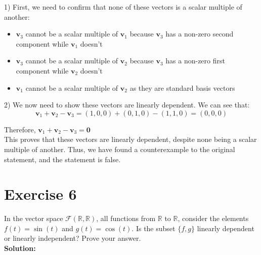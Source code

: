 \documentclass{article}
\begin{document}
1) First, we need to confirm that none of these vectors is a scalar multiple of another:
\begin{itemize}
   \item $\mathbf{v}_3$ cannot be a scalar multiple of $\mathbf{v}_1$ because $\mathbf{v}_3$ has a non-zero second component while $\mathbf{v}_1$ doesn't
   \item $\mathbf{v}_3$ cannot be a scalar multiple of $\mathbf{v}_2$ because $\mathbf{v}_3$ has a non-zero first component while $\mathbf{v}_2$ doesn't
   \item $\mathbf{v}_1$ cannot be a scalar multiple of $\mathbf{v}_2$ as they are standard basis vectors
\end{itemize}

2) We now need to show these vectors are linearly dependent.
We can see that:
\[
\mathbf{v}_1 + \mathbf{v}_2 - \mathbf{v}_3 = (1,0,0) + (0,1,0) - (1,1,0) = (0,0,0)
\]

Therefore, $\mathbf{v}_1 + \mathbf{v}_2 - \mathbf{v}_3 = \mathbf{0}$ \\

This proves that these vectors are linearly dependent, despite none being a scalar multiple of another. Thus, we have found a counterexample to the original statement, and the statement is false.

\newpage

\section*{Exercise 6}
In the vector space $\mathcal{F}(\mathbb{R},\mathbb{R})$, all functions from $\mathbb{R}$ to $\mathbb{R}$, consider the elements $f(t) = \sin(t)$ and $g(t) = \cos(t)$. Is the subset $\{f,g\}$ linearly dependent or linearly independent? Prove your answer. \\

\textbf{Solution:}
\end{document}
